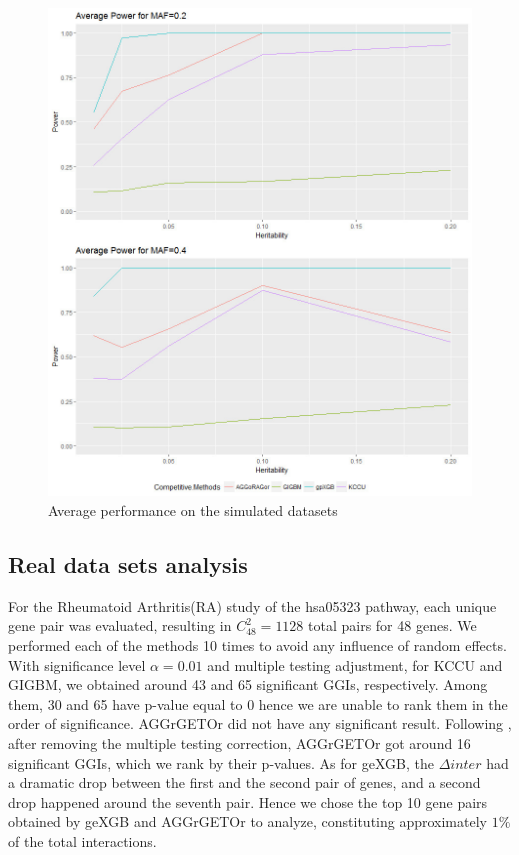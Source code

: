 \documentclass[11pt]{article}
\theoremstyle{plain}
\theoremstyle{definition}
\theoremstyle{remark}
\begin{document}
\begin{figure}[H]
    \begin{center}
       \includegraphics[scale=0.5]{average0204.jpg}
    \end{center}
\caption{\label{avg}Average performance on the simulated datasets}
\end{figure}


\subsection{Real data sets analysis}

For the Rheumatoid Arthritis(RA) study of the hsa05323 pathway, each unique gene pair was evaluated, resulting in $C_{48}^2=1128$ total pairs for 48 genes. We performed each of the methods 10 times to avoid any influence of random effects. With significance level $\alpha=0.01$ and multiple testing adjustment, for KCCU and GIGBM, we obtained around 43 and 65 significant GGIs, respectively. Among them, 30 and 65 have p-value equal to 0 hence we are unable to rank them in the order of significance. AGGrGETOr did not have any significant result. Following \cite{7}, after removing the multiple testing correction, AGGrGETOr got around 16 significant GGIs, which we rank by their p-values. As for geXGB, the $\Delta inter$ had a dramatic drop between the first and the second pair of genes, and a second drop happened around the seventh pair. Hence we chose the top 10 gene pairs obtained by geXGB and AGGrGETOr to analyze, constituting approximately $1\%$ of the total interactions. \\
\end{document}
